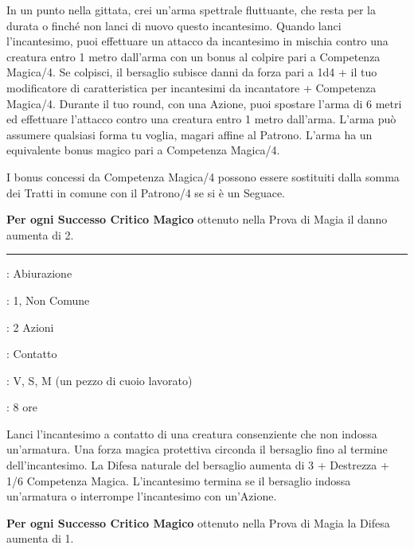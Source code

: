 \begin{multicols}{2}
In un punto nella gittata, crei un'arma spettrale fluttuante, che resta per la durata o finché non lanci di nuovo questo incantesimo. Quando lanci l'incantesimo, puoi effettuare un attacco da incantesimo in mischia contro una creatura entro 1 metro dall'arma con un bonus al colpire pari a Competenza Magica/4. Se colpisci, il bersaglio subisce danni da forza pari a 1d4 + il tuo modificatore di caratteristica per incantesimi da incantatore + Competenza Magica/4. Durante il tuo round, con una Azione, puoi spostare l'arma di 6 metri ed effettuare l'attacco contro una creatura entro 1 metro dall'arma. L'arma può assumere qualsiasi forma tu voglia, magari affine al Patrono. L'arma ha un equivalente bonus magico pari a Competenza Magica/4.

I bonus concessi da Competenza Magica/4 possono essere sostituiti dalla somma dei Tratti in comune con il Patrono/4 se si è un Seguace.

\textbf{Per ogni Successo Critico Magico} ottenuto nella Prova di Magia il danno aumenta di 2.

\smallskip\noindent\rule{\linewidth}{2pt} \hypertarget{Armatura Magica}{}\smallskip{}
\noindent
\begin{description}[noitemsep, topsep=0pt, parsep=0pt, partopsep=0pt, leftmargin=0cm, labelwidth=2.8cm]
	\item[\textbf{Lista di Magia}]: Abiurazione
	\item[\textbf{Livello}]: 1, Non Comune
	\item[\textbf{T. di Lancio}]: 2 Azioni
	\item[\textbf{Gittata}]: Contatto
	\item[\textbf{Componenti}]: V, S, M (un pezzo di cuoio lavorato)
	\item[\textbf{Durata}]: 8 ore
\end{description}

Lanci l'incantesimo a contatto di una creatura consenziente che non indossa un'armatura. Una forza magica protettiva circonda il bersaglio fino al termine dell'incantesimo. La Difesa naturale del bersaglio aumenta di 3 + Destrezza + 1/6 Competenza Magica. L'incantesimo termina se il bersaglio indossa un'armatura o interrompe l'incantesimo con un'Azione.

\textbf{Per ogni Successo Critico Magico} ottenuto nella Prova di Magia la Difesa aumenta di 1.


\end{multicols}
